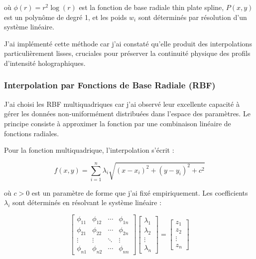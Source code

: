 \documentclass[10pt,twocolumn]{article}
\begin{document}
où $\phi(r) = r^2 \log(r)$ est la fonction de base radiale thin plate spline, $P(x,y)$ est un polynôme de degré 1, et les poids $w_i$ sont déterminés par résolution d'un système linéaire.

J'ai implémenté cette méthode car j'ai constaté qu'elle produit des interpolations particulièrement lisses, cruciales pour préserver la continuité physique des profils d'intensité holographiques.

\subsubsection{Interpolation par Fonctions de Base Radiale (RBF)}

J'ai choisi les RBF multiquadriques car j'ai observé leur excellente capacité à gérer les données non-uniformément distribuées dans l'espace des paramètres. Le principe consiste à approximer la fonction par une combinaison linéaire de fonctions radiales.

Pour la fonction multiquadrique, l'interpolation s'écrit :

\begin{equation}
f(x,y) = \sum_{i=1}^{n} \lambda_i \sqrt{(x-x_i)^2 + (y-y_i)^2 + c^2}
\end{equation}

où $c > 0$ est un paramètre de forme que j'ai fixé empiriquement. Les coefficients $\lambda_i$ sont déterminés en résolvant le système linéaire :

\begin{equation}
\begin{bmatrix}
\phi_{11} & \phi_{12} & \cdots & \phi_{1n} \\
\phi_{21} & \phi_{22} & \cdots & \phi_{2n} \\
\vdots & \vdots & \ddots & \vdots \\
\phi_{n1} & \phi_{n2} & \cdots & \phi_{nn}
\end{bmatrix}
\begin{bmatrix}
\lambda_1 \\
\lambda_2 \\
\vdots \\
\lambda_n
\end{bmatrix}
=
\begin{bmatrix}
z_1 \\
z_2 \\
\vdots \\
z_n
\end{bmatrix}
\end{equation}
\end{document}

